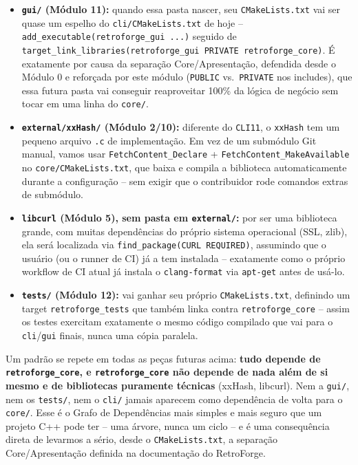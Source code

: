 \begin{itemize}
    \item \textbf{\texttt{gui/} (Módulo 11):} quando essa pasta nascer, seu \texttt{CMakeLists.txt} vai ser quase um espelho do \texttt{cli/CMakeLists.txt} de hoje -- \texttt{add\_executable(retroforge\_gui ...)} seguido de \texttt{target\_link\_libraries(retroforge\_gui PRIVATE retroforge\_core)}. É exatamente por causa da separação Core/Apresentação, defendida desde o Módulo 0 e reforçada por este módulo (\texttt{PUBLIC} vs.\ \texttt{PRIVATE} nos includes), que essa futura pasta vai conseguir reaproveitar 100\% da lógica de negócio sem tocar em uma linha do \texttt{core/}.
    \item \textbf{\texttt{external/xxHash/} (Módulo 2/10):} diferente do \texttt{CLI11}, o \texttt{xxHash} tem um pequeno arquivo \texttt{.c} de implementação. Em vez de um submódulo Git manual, vamos usar \texttt{FetchContent\_Declare} + \texttt{FetchContent\_MakeAvailable} no \texttt{core/CMakeLists.txt}, que baixa e compila a biblioteca automaticamente durante a configuração -- sem exigir que o contribuidor rode comandos extras de submódulo.
    \item \textbf{\texttt{libcurl} (Módulo 5), sem pasta em \texttt{external/}:} por ser uma biblioteca grande, com muitas dependências do próprio sistema operacional (SSL, zlib), ela será localizada via \texttt{find\_package(CURL REQUIRED)}, assumindo que o usuário (ou o runner de CI) já a tem instalada -- exatamente como o próprio workflow de CI atual já instala o \texttt{clang-format} via \texttt{apt-get} antes de usá-lo.
    \item \textbf{\texttt{tests/} (Módulo 12):} vai ganhar seu próprio \texttt{CMakeLists.txt}, definindo um target \texttt{retroforge\_tests} que também linka contra \texttt{retroforge\_core} -- assim os testes exercitam exatamente o mesmo código compilado que vai para o \texttt{cli}/\texttt{gui} finais, nunca uma cópia paralela.
\end{itemize}

\begin{CaixaInfo}
Um padrão se repete em todas as peças futuras acima: \textbf{tudo depende de \texttt{retroforge\_core}, e \texttt{retroforge\_core} não depende de nada além de si mesmo e de bibliotecas puramente técnicas} (xxHash, libcurl). Nem a \texttt{gui/}, nem os \texttt{tests/}, nem o \texttt{cli/} jamais aparecem como dependência de volta para o \texttt{core/}. Esse é o Grafo de Dependências mais simples e mais seguro que um projeto C++ pode ter -- uma árvore, nunca um ciclo -- e é uma consequência direta de levarmos a sério, desde o \texttt{CMakeLists.txt}, a separação Core/Apresentação definida na documentação do RetroForge.
\end{CaixaInfo}

